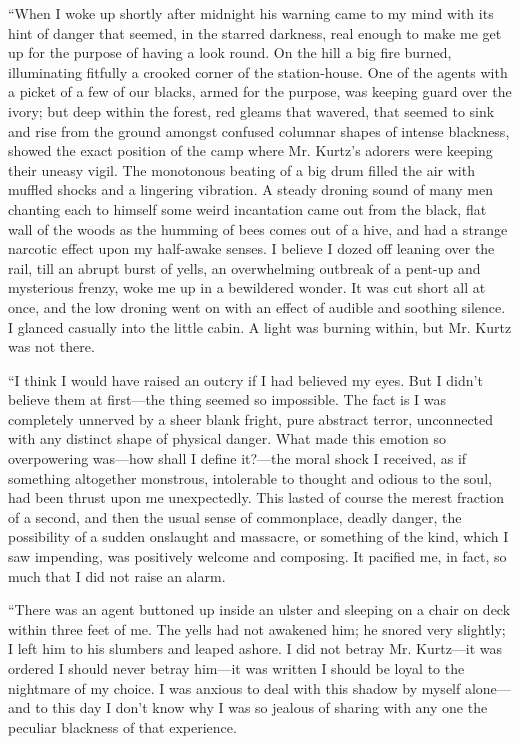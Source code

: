\documentclass[12pt]{report}
\begin{document}
``When I woke up shortly after midnight his warning came to my mind with
its hint of danger that seemed, in the starred darkness, real enough to
make me get up for the purpose of having a look round. On the hill a big
fire burned, illuminating fitfully a crooked corner of the
station-house. One of the agents with a picket of a few of our blacks,
armed for the purpose, was keeping guard over the ivory; but deep within
the forest, red gleams that wavered, that seemed to sink and rise from
the ground amongst confused columnar shapes of intense blackness, showed
the exact position of the camp where Mr. Kurtz's adorers were keeping
their uneasy vigil. The monotonous beating of a big drum filled the air
with muffled shocks and a lingering vibration. A steady droning sound of
many men chanting each to himself some weird incantation came out from
the black, flat wall of the woods as the humming of bees comes out of a
hive, and had a strange narcotic effect upon my half-awake senses. I
believe I dozed off leaning over the rail, till an abrupt burst of
yells, an overwhelming outbreak of a pent-up and mysterious frenzy, woke
me up in a bewildered wonder. It was cut short all at once, and the low
droning went on with an effect of audible and soothing silence. I
glanced casually into the little cabin. A light was burning within, but
Mr. Kurtz was not there.

``I think I would have raised an outcry if I had believed my eyes. But I
didn't believe them at first---the thing seemed so impossible. The fact
is I was completely unnerved by a sheer blank fright, pure abstract
terror, unconnected with any distinct shape of physical danger. What
made this emotion so overpowering was---how shall I define it?---the
moral shock I received, as if something altogether monstrous,
intolerable to thought and odious to the soul, had been thrust upon me
unexpectedly. This lasted of course the merest fraction of a second, and
then the usual sense of commonplace, deadly danger, the possibility of a
sudden onslaught and massacre, or something of the kind, which I saw
impending, was positively welcome and composing. It pacified me, in
fact, so much that I did not raise an alarm.

``There was an agent buttoned up inside an ulster and sleeping on a
chair on deck within three feet of me. The yells had not awakened him;
he snored very slightly; I left him to his slumbers and leaped ashore. I
did not betray Mr. Kurtz---it was ordered I should never betray him---it
was written I should be loyal to the nightmare of my choice. I was
anxious to deal with this shadow by myself alone---and to this day I
don't know why I was so jealous of sharing with any one the peculiar
blackness of that experience.
\end{document}

